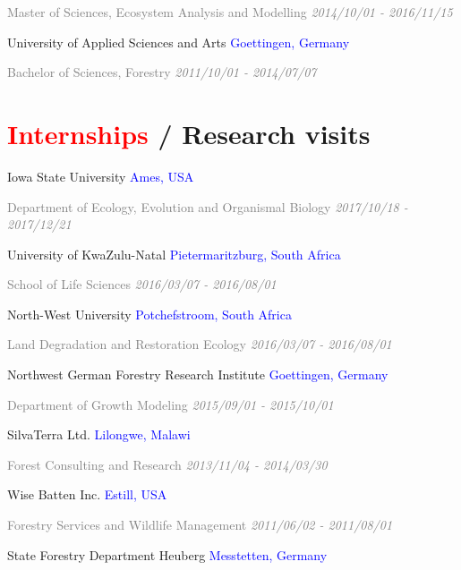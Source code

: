 \documentclass[hidelinks]{report}
\begin{document}
\textcolor{grey}{\footnotesize{Master of Sciences, Ecosystem Analysis and Modelling}}
\hfill
\textcolor{grey}{\textit{2014/10/01 - 2016/11/15}}

University of Applied Sciences and Arts
\hfill
\textcolor{blue}{Goettingen, Germany}

\textcolor{grey}{\footnotesize{Bachelor of Sciences, Forestry}}
\hfill
\textcolor{grey}{\textit{2011/10/01 - 2014/07/07}}


\section*{\textcolor{red}{Internships} / Research visits \sout{\hfill}}

Iowa State University
\hfill
\textcolor{blue}{Ames, USA}

\textcolor{grey}{\footnotesize{Department of Ecology, Evolution and Organismal Biology}}
\hfill
\textcolor{grey}{\textit{2017/10/18 - 2017/12/21}}

University of KwaZulu-Natal
\hfill
\textcolor{blue}{Pietermaritzburg, South Africa}

\textcolor{grey}{\footnotesize{School of Life Sciences}}
\hfill
\textcolor{grey}{\textit{2016/03/07 - 2016/08/01}}

North-West University
\hfill
\textcolor{blue}{Potchefstroom, South Africa}

\textcolor{grey}{\footnotesize{Land Degradation and Restoration Ecology}}
\hfill
\textcolor{grey}{\textit{2016/03/07 - 2016/08/01}}

Northwest German Forestry Research Institute
\hfill
\textcolor{blue}{Goettingen, Germany}

\textcolor{grey}{\footnotesize{Department of Growth Modeling}}
\hfill
\textcolor{grey}{\textit{2015/09/01 - 2015/10/01}}

SilvaTerra Ltd.
\hfill
\textcolor{blue}{Lilongwe, Malawi}

\textcolor{grey}{\footnotesize{Forest Consulting and Research}}
\hfill
\textcolor{grey}{\textit{2013/11/04 - 2014/03/30}}

Wise Batten Inc.
\hfill
\textcolor{blue}{Estill, USA}

\textcolor{grey}{\footnotesize{Forestry Services and Wildlife Management}}
\hfill
\textcolor{grey}{\textit{2011/06/02 - 2011/08/01}}

State Forestry Department Heuberg
\hfill
\textcolor{blue}{Messtetten, Germany}
\end{document}
